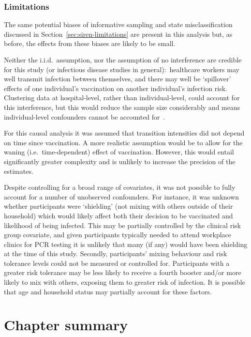 \subsubsection{Limitations}

The same potential biases of informative sampling and state misclassification discussed in Section~\ref{sec:siren-limitations} are present in this analysis but, as before, the effects from these biases are likely to be small.

Neither the i.i.d.\ assumption, nor the assumption of no interference are credible for this study (or infectious disease studies in general):\ healthcare workers may well transmit infection between themselves, and there may well be `spillover' effects of one individual's vaccination on another individual's infection risk. Clustering data at hospital-level, rather than individual-level, could account for this interference, but this would reduce the sample size considerably and means individual-level confounders cannot be accounted for~\parencite{Tchetgen_Tchetgen2012-hs}.

For this causal analysis it was assumed that transition intensities did not depend on time since vaccination. A more realistic assumption would be to allow for the waning (i.e.\ time-dependent) effect of vaccination. However, this would entail significantly greater complexity and is unlikely to increase the precision of the estimates.

Despite controlling for a broad range of covariates, it was not possible to fully account for a number of unobserved confounders. For instance, it was unknown whether participants were `shielding' (not mixing with others outside of their household) which would likely affect both their decision to be vaccinated and likelihood of being infected. This may be partially controlled by the clinical risk group covariate, and given participants typically needed to attend workplace clinics for PCR testing it is unlikely that many (if any) would have been shielding at the time of this study. Secondly, participants' mixing behaviour and risk tolerance levels could not be measured or controlled for. Participants with a greater risk tolerance may be less likely to receive a fourth booster and/or more likely to mix with others, exposing them to greater risk of infection. It is possible that age and household status may partially account for these factors.

\section{Chapter summary}

